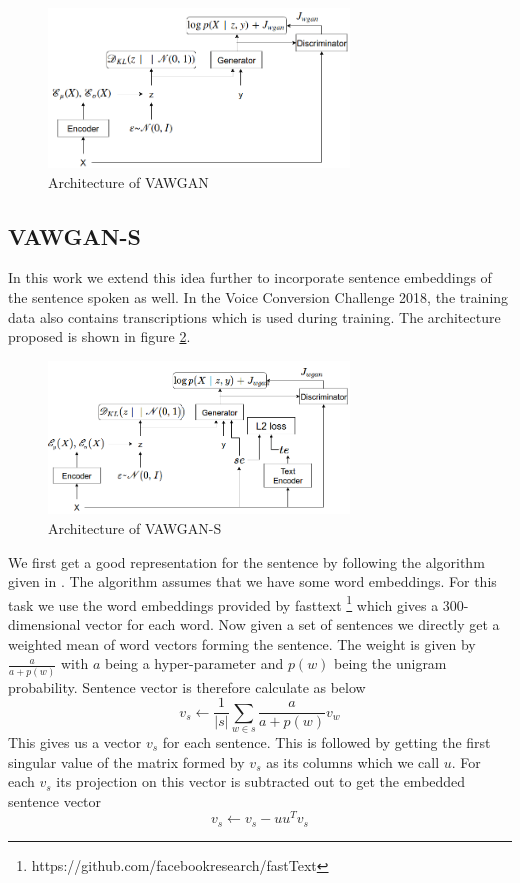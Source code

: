 \documentclass[letterpaper]{article}
\begin{document}
\begin{figure}[h]
	\includegraphics[width=8cm]{images/VAWGAN_network}
    \caption{Architecture of VAWGAN}
	\label{fig:vawgan}
\end{figure}

\subsection{VAWGAN-S}
In this work we extend this idea further to incorporate sentence embeddings of the sentence spoken as well. In the Voice Conversion Challenge 2018, %
the training data also contains transcriptions which is used during training. The architecture proposed is shown in figure \ref{fig:vawgans}.

\begin{figure}
	\includegraphics[width=8cm]{images/VAWGAN_S}
    \caption{Architecture of VAWGAN-S}
    \label{fig:vawgans}
\end{figure}

We first get a good representation for the sentence by following the algorithm given in \cite{arora2017asimple}.
The algorithm assumes that we have some word embeddings. For this task we use the word embeddings provided by fasttext \footnote{https://github.com/facebookresearch/fastText} \cite{bojanowski2016enriching} which gives a 300-dimensional vector for each word. Now given a set of sentences we directly get a weighted mean of word vectors forming the sentence. The weight is given by $\frac{a}{a + p(w)}$ with $a$ being a hyper-parameter and $p(w)$ being the unigram probability. Sentence vector is therefore calculate as below
\[v_s \leftarrow \frac{1}{|s|}\sum_{w\in s}\frac{a}{a+p(w)}v_w\] 
This gives us a vector $v_s$ for each sentence. This is followed by getting the first singular value of the matrix formed by $v_s$ as its columns which we call $u$. For each $v_s$ its projection on this vector is subtracted out to get the embedded sentence vector
\[v_s \leftarrow v_s - u u^T v_s\]
\end{document}

